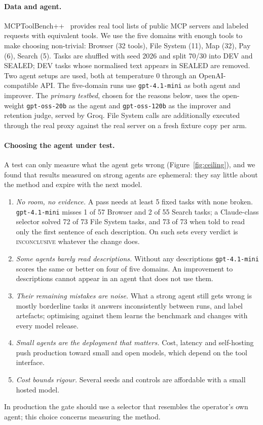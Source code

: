 \documentclass[11pt]{article}
\newcommand{\incon}{\textsc{inconclusive}}
\begin{document}
\paragraph{Data and agent.} MCPToolBench++~\cite{mcptoolbenchpp} provides real tool lists of public MCP servers and labeled
requests with equivalent tools. We use the five domains with enough tools to make choosing non-trivial: Browser (32 tools),
File System (11), Map (32), Pay (6), Search (5). Tasks are shuffled with seed 2026 and split 70/30 into DEV and SEALED; DEV tasks
whose normalised text appears in SEALED are removed. Two agent setups are used, both at temperature 0 through an
OpenAI-compatible API. The five-domain runs use \texttt{gpt-4.1-mini} as both agent and improver. The \emph{primary testbed}, chosen
for the reasons below, uses the open-weight \texttt{gpt-oss-20b} as the agent and \texttt{gpt-oss-120b} as the improver and
retention judge, served by Groq. File System calls are additionally executed through the real proxy against the real server on a
fresh fixture copy per arm.

\paragraph{Choosing the agent under test.} A test can only measure what the agent gets wrong (Figure~\ref{fig:ceiling}), and we
found that results measured on strong agents are ephemeral: they say little about the method and expire with the next model.
\begin{enumerate}
  \item \emph{No room, no evidence.} A pass needs at least 5 fixed tasks with none broken. \texttt{gpt-4.1-mini} misses 1 of 57
        Browser and 2 of 55 Search tasks; a Claude-class selector solved 72 of 73 File System tasks, and 73 of 73 when told to read
        only the first sentence of each description. On such sets every verdict is \incon{} whatever the change does.
  \item \emph{Some agents barely read descriptions.} Without any descriptions \texttt{gpt-4.1-mini} scores the same or better on
        four of five domains. An improvement to descriptions cannot appear in an agent that does not use them.
  \item \emph{Their remaining mistakes are noise.} What a strong agent still gets wrong is mostly borderline tasks it answers
        inconsistently between runs, and label artefacts; optimising against them learns the benchmark and changes with every
        model release.
  \item \emph{Small agents are the deployment that matters.} Cost, latency and self-hosting push production toward small and open
        models, which depend on the tool interface.
  \item \emph{Cost bounds rigour.} Several seeds and controls are affordable with a small hosted model.
\end{enumerate}
In production the gate should use a selector that resembles the operator's own agent; this choice concerns measuring the method.
\end{document}

